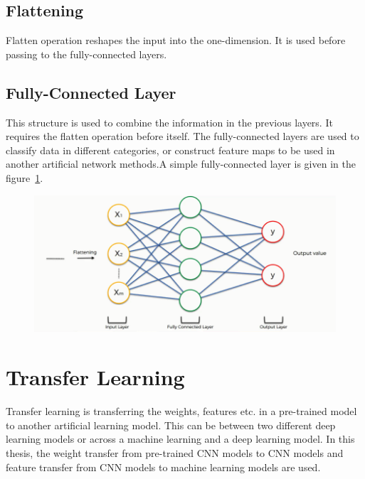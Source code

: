\subsection{Flattening}

Flatten operation reshapes the input into the one-dimension. It is used before passing to the fully-connected layers.

\subsection{Fully-Connected Layer}

This structure is used to combine the information in the previous layers. It requires the flatten operation before itself. The fully-connected layers are used to classify data in different categories, or construct feature maps to be used in another artificial network methods.A simple fully-connected layer is given in the figure~\ref{fig:fully_connected_layer}.

\begin{figure}[h]
    \centering
    \includegraphics[width=\linewidth]{fig/fully_connected_layer.png}
	\vspace*{1mm}
    \label{fig:fully_connected_layer}
\end{figure}

\section{Transfer Learning} \label{CH3:transfer_learning}

Transfer learning is transferring the weights, features etc. in a pre-trained model to another artificial learning model. This can be between two different deep learning models or across a machine learning and a deep learning model. In this thesis, the weight transfer from pre-trained CNN models to CNN models and feature transfer from CNN models to machine learning models are used.

